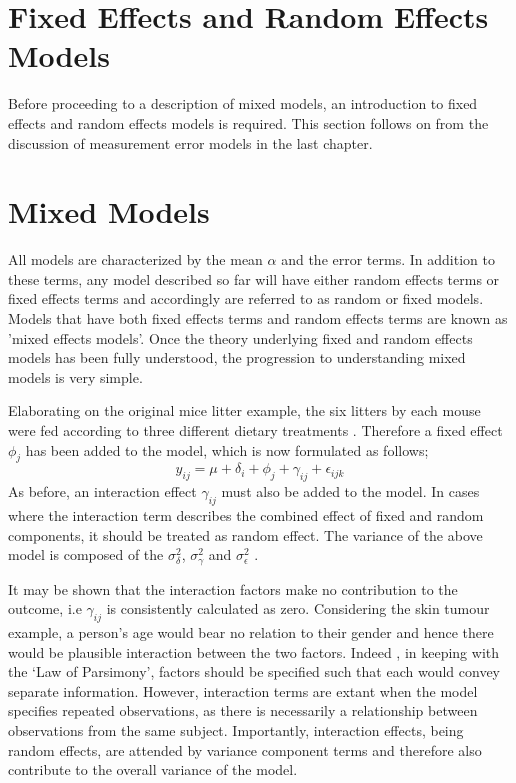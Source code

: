 \documentclass[12pt, a4paper]{report}
\theoremstyle{plain}
\theoremstyle{definition}
\theoremstyle{remark}
\begin{document}
\section{Fixed Effects and Random Effects Models}
Before proceeding to a description of mixed models, an
introduction to fixed effects and random effects models is
required. This section follows on from the discussion of
measurement error models in the last chapter.




\section{Mixed Models}


All models are characterized by the mean $\alpha$ and the error
terms. In addition to these terms, any model described so far will
have either random effects terms or fixed effects terms and
accordingly are referred to as random or fixed models. Models that
have both fixed effects terms and random effects terms are known
as 'mixed effects models'. Once the theory underlying fixed and
random effects models has been fully understood, the progression
to understanding mixed models is very simple.

Elaborating on the original mice litter example, the six litters
by each mouse were fed according to three different dietary
treatments \citep{Searle}. Therefore a fixed effect $\phi_{j}$ has
been added to the model, which is now formulated as follows;
\begin{equation}
y_{ij} = \mu + \delta_{i} + \phi_{j} + \gamma_{ij} +
\epsilon_{ijk}
\end{equation}
As before, an interaction effect $\gamma_{ij}$ must also be added
to the model. In cases where the interaction term describes the
combined effect of fixed and random components, it should be
treated as random effect. The variance of the above model is
composed of the $\sigma^{2}_{\delta}$, $\sigma^{2}_{\gamma}$ and
$\sigma^{2}_{\epsilon}$ .


It may be shown that the interaction factors make no contribution
to the outcome, i.e $\gamma_{ij}$ is consistently calculated as
zero. Considering the skin tumour example, a person's age would
bear no relation to their gender and hence there would be
plausible interaction between the two factors. Indeed , in keeping
with the `Law of Parsimony', factors should be specified such that
each would convey separate information. However, interaction terms
are extant when the model specifies repeated observations, as
there is necessarily a relationship between observations from the
same subject. Importantly, interaction effects, being random
effects, are attended by variance component terms and therefore
also contribute to the overall variance of the model.
\end{document}
